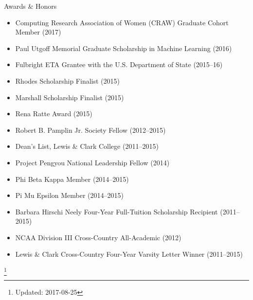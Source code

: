 \documentclass{resume} %
\newcommand\blfootnote[1]{%
  \begingroup
  \renewcommand\thefootnote{}\footnote{#1}%
  \addtocounter{footnote}{-1}%
  \endgroup
}
\begin{document}

\begin{rSection}{Awards \& Honors}
\begin{itemize}
\item Computing Research Association of Women (CRAW) Graduate Cohort Member (2017) 
\item Paul Utgoff Memorial Graduate Scholarship in Machine Learning (2016) 
\item Fulbright ETA Grantee with the U.S. Department of State (2015--16)
\item Rhodes Scholarship Finalist (2015) 
\item Marshall Scholarship Finalist (2015) 
\item Rena Ratte Award (2015) 
\item Robert B. Pamplin Jr. Society Fellow (2012--2015)
\item Dean's List, Lewis \& Clark College (2011--2015)
\item Project Pengyou National Leadership Fellow (2014) 
\item Phi Beta Kappa Member (2014--2015)
\item Pi Mu Epsilon Member (2014--2015)
\item Barbara Hirschi Neely Four-Year Full-Tuition Scholarship Recipient (2011--2015)
\item NCAA Division III Cross-Country All-Academic (2012) 
\item Lewis \& Clark Cross-Country Four-Year Varsity Letter Winner (2011--2015)
\end{itemize} 

\end{rSection}

\blfootnote{Updated: 2017-08-25}

\bigskip
\end{document}
